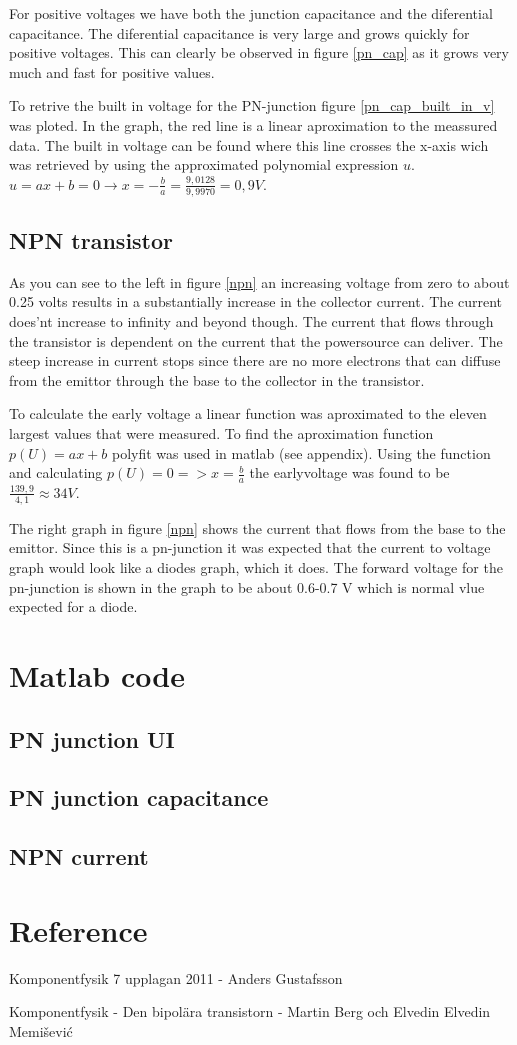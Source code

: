 \documentclass[a4paper]{article}
\begin{document}
For positive voltages we have both the junction capacitance and the diferential capacitance. The diferential capacitance is very large and grows quickly for positive voltages. This can clearly be observed in figure \ref{pn_cap} as it grows very much and fast for positive values.

To retrive the built in voltage for the PN-junction figure \ref{pn_cap_built_in_v} was ploted. In the graph, the red line is a linear aproximation to the meassured data. The built in voltage can be found where this line crosses the x-axis wich was retrieved by using the approximated polynomial expression $u$. $ u = ax + b = 0 \rightarrow x = -\frac{b}{a} = \frac{9,0128}{9,9970} = 0,9V$.

\subsection{NPN transistor}
As you can see to the left in figure \ref{npn} an increasing voltage from zero to about 0.25 volts results in a substantially increase in the collector current. The current does'nt increase to infinity and beyond though. The current that flows through the transistor is dependent on the current that the powersource can deliver. The steep increase in current stops since there are no more electrons that can diffuse from the emittor through the base to the collector in the transistor.

To calculate the early voltage a linear function was aproximated to the eleven largest values that were measured. To find the aproximation function $p(U) = ax + b$ polyfit was used in matlab (see appendix). Using the function and calculating $p(U) = 0 => x = \frac{b}{a}$ the earlyvoltage was found to be $\frac{139,9}{4,1} \approx 34V$.

The right graph in figure \ref{npn} shows the current that flows from the base to the emittor. Since this is a pn-junction it was expected that the current to voltage graph would look like a diodes graph, which it does. The forward voltage for the pn-junction is shown in the graph to be about 0.6-0.7 V which is normal vlue expected for a diode.

\newpage
\appendix
\section{Matlab code}
\subsection{PN junction UI}

\subsection{PN junction capacitance}

\subsection{NPN current}


\newpage
\section{Reference}
Komponentfysik  7 upplagan 2011 - Anders Gustafsson

Komponentfysik - Den bipolära transistorn - Martin Berg och Elvedin Elvedin Memišević
\end{document}
